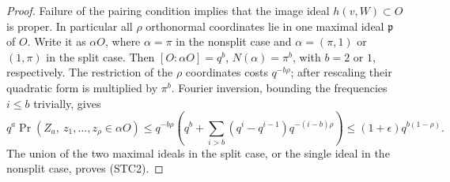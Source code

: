 \begin{proof}
Failure of the pairing condition implies that the image
ideal \(h(v,W)\subset O\) is proper. In particular all
\(\rho\) orthonormal coordinates lie in one maximal ideal
\(\mathfrak p\) of \(O\). Write it as \(\alpha O\),
where \(\alpha=\pi\) in the nonsplit case and
\(\alpha=(\pi,1)\) or \((1,\pi)\) in the split case.
Then \([O:\alpha O]=q^b\), \(N(\alpha)=\pi^b\),
with \(b=2\) or \(1\), respectively. The restriction
of the \(\rho\) coordinates costs \(q^{-b\rho}\);
after rescaling their quadratic form is multiplied
by \(\pi^b\). Fourier inversion, bounding the
frequencies \(i\le b\) trivially, gives
\[
 q^a\Pr(Z_a,\ z_1,\dots,z_\rho\in\alpha O)
 \le q^{-b\rho}\left(q^b+
     \sum_{i>b}(q^i-q^{i-1})q^{-(i-b)\rho}\right)
 \le (1+\epsilon)q^{b(1-\rho)} .
\]
The union of the two maximal ideals in the split case,
or the single ideal in the nonsplit case, proves (STC2).
\end{proof}

